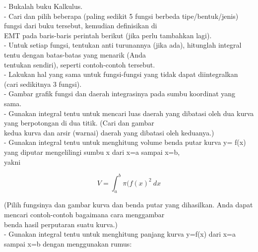 \documentclass[a4paper,10pt]{article}
\begin{document}
\begin{eulernotebook}
\begin{eulercomment}
\begin{eulercomment}
\begin{eulercomment}
\begin{eulercomment}
\begin{eulercomment}
\begin{eulercomment}
\begin{eulercomment}
\begin{eulercomment}
\begin{eulercomment}
\begin{eulercomment}
\begin{eulercomment}
\begin{eulercomment}
\begin{eulercomment}
\begin{eulercomment}
\begin{eulercomment}
\begin{eulercomment}
\begin{eulercomment}
\begin{eulercomment}
\begin{eulercomment}
\begin{eulercomment}
\begin{eulercomment}
\begin{eulercomment}
\begin{eulercomment}
\begin{eulercomment}
\begin{eulercomment}
- Bukalah buku Kalkulus.\\
- Cari dan pilih beberapa (paling sedikit 5 fungsi berbeda
tipe/bentuk/jenis) fungsi dari buku tersebut, kemudian definisikan di\\
EMT pada baris-baris perintah berikut (jika perlu tambahkan lagi).\\
- Untuk setiap fungsi, tentukan anti turunannya (jika ada), hitunglah
integral tentu dengan batas-batas yang menarik (Anda\\
tentukan sendiri), seperti contoh-contoh tersebut.\\
- Lakukan hal yang sama untuk fungsi-fungsi yang tidak dapat
diintegralkan (cari sedikitnya 3 fungsi).\\
- Gambar grafik fungsi dan daerah integrasinya pada sumbu koordinat
yang sama.\\
- Gunakan integral tentu untuk mencari luas daerah yang dibatasi oleh
dua kurva yang berpotongan di dua titik. (Cari dan gambar\\
kedua kurva dan arsir (warnai) daerah yang dibatasi oleh keduanya.)\\
- Gunakan integral tentu untuk menghitung volume benda putar kurva y=
f(x) yang diputar mengelilingi sumbu x dari x=a sampai x=b,\\
yakni

\end{eulercomment}
\begin{eulerformula}
\[
V = \int_a^b \pi (f(x)^2\ dx
\]
\end{eulerformula}
\begin{eulercomment}
(Pilih fungsinya dan gambar kurva dan benda putar yang dihasilkan.
Anda dapat mencari contoh-contoh bagaimana cara menggambar\\
benda hasil perputaran suatu kurva.)\\
- Gunakan integral tentu untuk menghitung panjang kurva y=f(x) dari
x=a sampai x=b dengan menggunakan rumus:


\end{eulercomment}
\end{eulercomment}
\end{eulercomment}
\end{eulercomment}
\end{eulercomment}
\end{eulercomment}
\end{eulercomment}
\end{eulercomment}
\end{eulercomment}
\end{eulercomment}
\end{eulercomment}
\end{eulercomment}
\end{eulercomment}
\end{eulercomment}
\end{eulercomment}
\end{eulercomment}
\end{eulercomment}
\end{eulercomment}
\end{eulercomment}
\end{eulercomment}
\end{eulercomment}
\end{eulercomment}
\end{eulercomment}
\end{eulercomment}
\end{eulercomment}
\end{eulernotebook}
\end{document}
